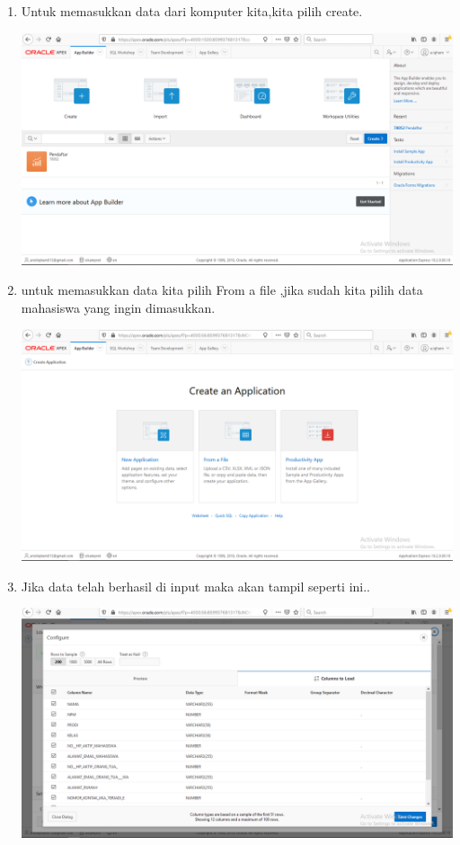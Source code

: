 \documentclass{article}
\begin{document}
\begin{enumerate}
\begin{center}
\end{center}
    \item Untuk memasukkan data dari komputer kita,kita pilih create.
    \begin{center}
    \includegraphics[width=.8\textwidth]{tb4.PNG}
\end{center}
    \item untuk memasukkan data kita pilih From a file ,jika sudah kita pilih data mahasiswa yang ingin dimasukkan.
    \begin{center}
    \includegraphics[width=.8\textwidth]{tb5.PNG}
\end{center}
    \item Jika data telah berhasil di input maka akan tampil seperti ini..
    \begin{center}
    \includegraphics[width=.8\textwidth]{tb7.PNG}
\end{center}

\end{enumerate}
\end{document}
